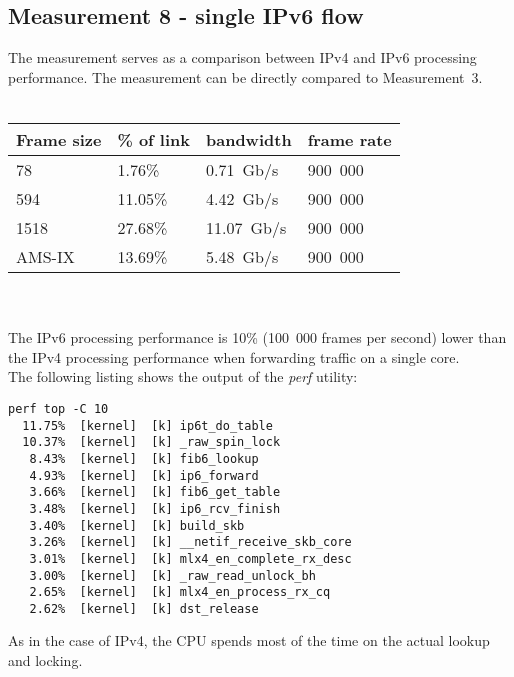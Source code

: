 
\subsection{Measurement 8 - single IPv6 flow}
The measurement serves as a comparison between IPv4 and IPv6 processing performance.
The measurement can be directly compared to Measurement~3.
\\
\\
\begin{tabular}{ | l | l | l | l |}
\hline
Frame size & \% of link & bandwidth & frame rate \\
\hline
78     &  1.76\% &  0.71~Gb/s & 900~000 \\
594    & 11.05\% &  4.42~Gb/s & 900~000 \\
1518   & 27.68\% & 11.07~Gb/s & 900~000 \\
AMS-IX & 13.69\% &  5.48~Gb/s & 900~000 \\
\hline
\end{tabular}
\\
\\
The IPv6 processing performance is 10\% (100~000 frames per second) lower than the IPv4 processing performance
when forwarding traffic on a single core.
\\
The following listing shows the output of the {\it{perf}} utility:
\begin{lstlisting}
perf top -C 10
  11.75%  [kernel]  [k] ip6t_do_table
  10.37%  [kernel]  [k] _raw_spin_lock
   8.43%  [kernel]  [k] fib6_lookup
   4.93%  [kernel]  [k] ip6_forward
   3.66%  [kernel]  [k] fib6_get_table
   3.48%  [kernel]  [k] ip6_rcv_finish
   3.40%  [kernel]  [k] build_skb
   3.26%  [kernel]  [k] __netif_receive_skb_core
   3.01%  [kernel]  [k] mlx4_en_complete_rx_desc
   3.00%  [kernel]  [k] _raw_read_unlock_bh
   2.65%  [kernel]  [k] mlx4_en_process_rx_cq
   2.62%  [kernel]  [k] dst_release
\end{lstlisting}
As in the case of IPv4, the CPU spends most of the time on the actual lookup and locking.

